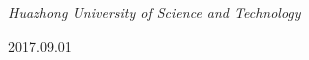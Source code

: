 \documentclass[a4paper]{article}
\begin{document}
\begin{titlepage}
	\vspace{0.5\baselineskip} %
	
	\textit{Huazhong University of Science and Technology} %
	
	\vfill %
	
	
	2017.09.01 %
	

\end{titlepage}
\setcounter{secnumdepth}{0}

\tableofcontents
\newpage
%
%
%
%
%
\end{document}
